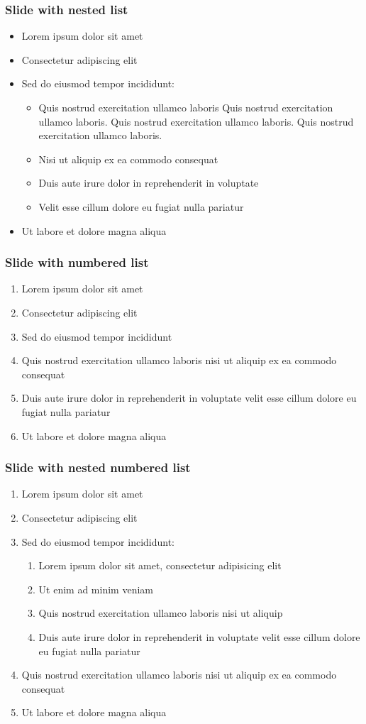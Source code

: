 \documentclass[11pt,xcolor={dvipsnames},hyperref={pdftex,pdfpagemode=UseNone,hidelinks,pdfdisplaydoctitle=true},usepdftitle=false]{beamer}
\begin{document}
\begin{frame}
\frametitle{Slide with nested list}
\begin{itemize}
\item Lorem ipsum dolor sit amet
\item Consectetur adipiscing elit
\item Sed do eiusmod tempor incididunt:
\begin{itemize}
\item Quis nostrud exercitation ullamco laboris Quis nostrud exercitation ullamco laboris. Quis nostrud exercitation ullamco laboris. Quis nostrud exercitation ullamco laboris.
\item Nisi ut aliquip ex ea commodo consequat
\item Duis aute irure dolor in reprehenderit in voluptate
\item Velit esse cillum dolore eu fugiat nulla pariatur
\end{itemize}
\item Ut labore et dolore magna aliqua
\end{itemize}
\end{frame}

\begin{frame}
\frametitle{Slide with numbered list}
\begin{enumerate}
\item Lorem ipsum dolor sit amet
\item Consectetur adipiscing elit
\item Sed do eiusmod tempor incididunt
\item Quis nostrud exercitation ullamco laboris nisi ut aliquip ex ea commodo consequat
\item Duis aute irure dolor in reprehenderit in voluptate velit esse cillum dolore eu fugiat nulla pariatur
\item Ut labore et dolore magna aliqua
\end{enumerate}
\end{frame}

\begin{frame}
\frametitle{Slide with nested numbered list}
\begin{enumerate}
\item Lorem ipsum dolor sit amet
\item Consectetur adipiscing elit
\item Sed do eiusmod tempor incididunt:
\begin{enumerate}
\item Lorem ipsum dolor sit amet, consectetur adipisicing elit
\item Ut enim ad minim veniam
\item Quis nostrud exercitation ullamco laboris nisi ut aliquip
\item Duis aute irure dolor in reprehenderit in voluptate velit esse cillum dolore eu fugiat nulla pariatur
\end{enumerate}
\item Quis nostrud exercitation ullamco laboris nisi ut aliquip ex ea commodo consequat
\item Ut labore et dolore magna aliqua
\end{enumerate}
\end{frame}
\end{document}
